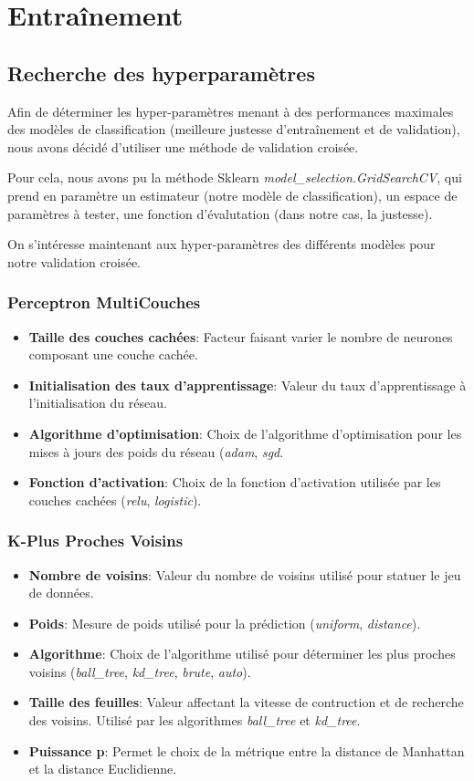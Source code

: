 \section{Entraînement}

\subsection{Recherche des hyperparamètres}
Afin de déterminer les hyper-paramètres menant à des performances maximales des modèles de classification (meilleure justesse d'entraînement et de validation), nous avons décidé d'utiliser une méthode de validation croisée. 

Pour cela, nous avons pu la méthode Sklearn \emph{model\_selection.GridSearchCV}, qui prend en paramètre un estimateur (notre modèle de classification), un espace de paramètres à tester, une fonction d'évalutation (dans notre cas, la justesse).

On s'intéresse maintenant aux hyper-paramètres des différents modèles pour notre validation croisée. 

\subsubsection*{Perceptron MultiCouches}
\begin{itemize}
	\item \textbf{Taille des couches cachées}: Facteur faisant varier le nombre de neurones composant une couche cachée.
	\item \textbf{Initialisation des taux d'apprentissage}: Valeur du taux d'apprentissage à l'initialisation du réseau. 
	\item \textbf{Algorithme d'optimisation}: Choix de l'algorithme d'optimisation pour les mises à jours des poids du réseau (\emph{adam}, \emph{sgd}.
	\item \textbf{Fonction d'activation}: Choix de la fonction d'activation utilisée par les couches cachées (\emph{relu}, \emph{logistic}).
\end{itemize}

\subsubsection*{K-Plus Proches Voisins}
\begin{itemize}
	\item \textbf{Nombre de voisins}: Valeur du nombre de voisins utilisé pour statuer le jeu de données.
	\item \textbf{Poids}: Mesure de poids utilisé pour la prédiction (\emph{uniform}, \emph{distance}). 
	\item \textbf{Algorithme}: Choix de l'algorithme utilisé pour déterminer les plus proches voisins (\emph{ball\_tree}, \emph{kd\_tree}, \emph{brute}, \emph{auto}).
	\item \textbf{Taille des feuilles}: Valeur affectant la vitesse de contruction et de recherche des voisins. Utilisé par les algorithmes \emph{ball\_tree} et \emph{kd\_tree}.
	\item \textbf{Puissance p}: Permet le choix de la métrique entre la distance de Manhattan et la distance Euclidienne.
\end{itemize}

